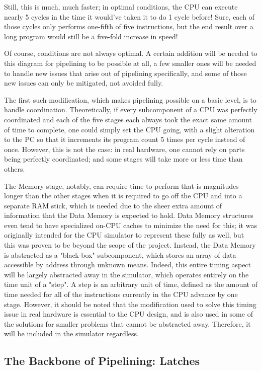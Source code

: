 \documentclass[12pt,twoside]{reedthesis}
\begin{document}
Still, this is much, much faster;  in optimal conditions, the CPU can execute nearly 5 cycles in the time it would've taken it to do 1 cycle before! Sure, each of those cycles only performs one-fifth of five instructions, but the end result over a long program would still be a five-fold increase in speed!

Of course, conditions are not always optimal. A certain addition will be needed to this diagram for pipelining to be possible at all, a few smaller ones will be needed to handle new issues that arise out of pipelining specifically, and some of those new issues can only be mitigated, not avoided fully.

The first such modification, which makes pipelining possible on a basic level, is to handle coordination. Theoretically, if  every subcomponent of a CPU was perfectly coordinated and each of the five stages each always took the exact same amount of time to complete, one could simply set the CPU going, with a slight alteration to the PC so that it increments its program count 5 times per cycle instead of once.
However, this is not the case: in real hardware, one cannot rely on parts being perfectly coordinated; and some stages will take more or less time than others.

The Memory stage, notably, can require time to perform that is magnitudes longer than the other stages when it is required to go off the CPU and into a separate RAM stick, which is needed due to the sheer extra amount of information that the Data Memory is expected to hold.
Data Memory structures even tend to have specialized on-CPU caches to minimize the need for this; it was originally intended for the CPU simulator to represent these fully as well, but this was proven to be beyond the scope of the project.
Instead, the Data Memory is abstracted as a "black-box" subcomponent, which stores an array of data accessible by address through unknown means. Indeed, this entire timing aspect will be largely abstracted away in the simulator, which operates entirely on the time unit of a "step".
A step is an arbitrary unit of time, defined as the amount of time needed for all of the instructions currently in the CPU advance by one stage. However, it should be noted that the modification used to solve this timing issue in real hardware is essential to the CPU design, and is also used in some of the solutions for smaller problems that cannot be abstracted away. Therefore, it will be included in the simulator regardless.

\subsection{The Backbone of Pipelining: Latches}
\end{document}
